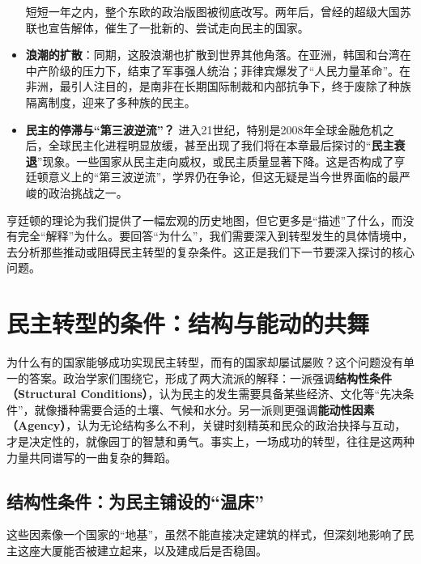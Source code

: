 \begin{itemize}
\begin{itemize}
    \end{itemize}
    短短一年之内，整个东欧的政治版图被彻底改写。两年后，曾经的超级大国苏联也宣告解体，催生了一批新的、尝试走向民主的国家。
    \item \textbf{浪潮的扩散}：同期，这股浪潮也扩散到世界其他角落。在亚洲，韩国和台湾在中产阶级的压力下，结束了军事强人统治；菲律宾爆发了“人民力量革命”。在非洲，最引人注目的，是南非在长期国际制裁和内部抗争下，终于废除了种族隔离制度，迎来了多种族的民主。
    \item \textbf{民主的停滞与“第三波逆流”？}
    进入21世纪，特别是2008年全球金融危机之后，全球民主化进程明显放缓，甚至出现了我们将在本章最后探讨的“\textbf{民主衰退}”现象。一些国家从民主走向威权，或民主质量显著下降。这是否构成了亨廷顿意义上的“第三波逆流”，学界仍在争论，但这无疑是当今世界面临的最严峻的政治挑战之一。
\end{itemize}

亨廷顿的理论为我们提供了一幅宏观的历史地图，但它更多是“描述”了什么，而没有完全“解释”为什么。要回答“为什么”，我们需要深入到转型发生的具体情境中，去分析那些推动或阻碍民主转型的复杂条件。这正是我们下一节要深入探讨的核心问题。

\section{民主转型的条件：结构与能动的共舞}

为什么有的国家能够成功实现民主转型，而有的国家却屡试屡败？这个问题没有单一的答案。政治学家们围绕它，形成了两大流派的解释：一派强调\textbf{结构性条件（Structural Conditions）}，认为民主的发生需要具备某些经济、文化等“先决条件”，就像播种需要合适的土壤、气候和水分。另一派则更强调\textbf{能动性因素（Agency）}，认为无论结构多么不利，关键时刻精英和民众的政治抉择与互动，才是决定性的，就像园丁的智慧和勇气。事实上，一场成功的转型，往往是这两种力量共同谱写的一曲复杂的舞蹈。

\subsection{结构性条件：为民主铺设的“温床”}

这些因素像一个国家的“地基”，虽然不能直接决定建筑的样式，但深刻地影响了民主这座大厦能否被建立起来，以及建成后是否稳固。

